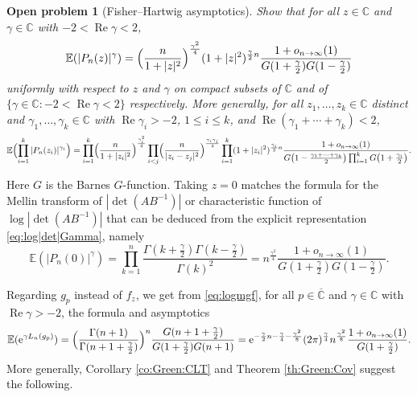 \documentclass[10pt,reqno]{amsart}
\numberwithin{equation}{section}
\numberwithin{figure}{section}
\theoremstyle{plain}
\newtheorem{openproblem}[theorem]{Open problem}
\newcommand{\<}{\langle}
\renewcommand{\>}{\rangle}
\renewcommand{\Re}{\operatorname{Re}}
\begin{document}
\begin{openproblem}[Fisher--Hartwig asymptotics]\label{op:LogPot:FH}
Show that for all $z\in\mathbb{C}$ and $\gamma\in\mathbb{C}$ with $-2<\Re\gamma<2$,
\begin{equation}\label{eq:FH}
    \mathbb{E}(|P_n(z)|^\gamma)
	=\Bigl(\frac{n}{1+|z|^2}\Bigr)^{\frac{\gamma^2}{4}}
    (1+|z|^2)^{\frac{\gamma}{2}n}
    \frac{1+o_{n\to\infty}(1)}{G(1+\frac{\gamma}{2})G(1-\frac{\gamma}{2})}
\end{equation}
uniformly with respect to $z$ and $\gamma$ on compact subsets of $\mathbb{C}$ and of $\{\gamma\in\mathbb{C}:-2<\Re\gamma <2\}$ respectively. More generally, for all $z_1,\ldots,z_k\in\mathbb C$ distinct and $\gamma_1,\ldots,\gamma_k\in\mathbb{C}$ with $\Re\gamma_i>-2$, $1\leq i\leq k$, and $\Re(\gamma_1+\cdots+\gamma_k)<2$,
\[
\mathbb{E}\Bigl(\prod_{i=1}^k|P_n(z_i)|^{\gamma_i}\Bigr)
=\prod_{i=1}^k\Bigl(\frac{n}{1+|z_i|^2}\Bigr)^{\frac{\gamma_i^2}{4}}
\prod_{i<j}\Bigl(\frac{n}{|z_i-z_j|^2}\Bigr)^{\frac{\gamma_i\gamma_j}{4}}
\prod_{i=1}^k(1+|z_i|^2)^{\frac{\gamma_i}{2}n}
\frac{1+o_{n\to\infty}(1)}
{G\bigl(1-\frac{\gamma_1+\cdots+\gamma_k}{2}\bigr)\prod_{i=1}^kG\bigl(1+\frac{\gamma_i}{2}\bigr)}.
\]
\end{openproblem}
Here $G$ is the Barnes $G$-function.
Taking $z=0$ matches the formula for the Mellin transform of $|\det(AB^{-1})|$ or characteristic function of $\log|\det(AB^{-1})|$ that 
can be deduced from the explicit representation \eqref{eq:log|det|Gamma}, namely
\begin{equation}
\mathbb{E}(|P_n(0)|^\gamma)
%
%
=\prod_{k=1}^n\frac{\Gamma(k+\frac{\gamma}{2})\Gamma(k-\frac{\gamma}{2})}{\Gamma(k)^2}
=n^{\frac{\gamma^2}{4}}\frac{1+o_{n\to\infty}(1)}{G(1+\frac{\gamma}{2})G(1-\frac{\gamma}{2})}.
\end{equation}
%
%

Regarding $g_p$ instead of $f_z$, we get from \eqref{eq:logmgf}, for all $p\in\overline{\mathbb{C}}$ and $\gamma\in\mathbb{C}$ with $\Re\gamma>-2$, the formula and asymptotics
\begin{equation}\label{eq:Green:FH}
    \mathbb{E}(\mathrm{e}^{\gamma L_n(g_p)})
    =\Bigl(\frac{\Gamma(n+1)}{\Gamma(n+1+\frac{\gamma}{2})}\Bigr)^n
    \frac{G(n+1+\frac{\gamma}{2})}{G(1+\frac{\gamma}{2})G(n+1)}
    =\mathrm{e}^{-\frac{\gamma}{2}n-\frac{\gamma}{4}-\frac{\gamma^2}{8}}
    (2\pi)^{\frac{\gamma}{4}}    
    n^{\frac{\gamma^2}{8}}
    \frac{1+o_{n\to\infty}(1)}{G(1+\frac{\gamma}{2})}.
\end{equation}
More generally, Corollary \ref{co:Green:CLT} and Theorem \ref{th:Green:Cov} suggest the following.
\end{document}
